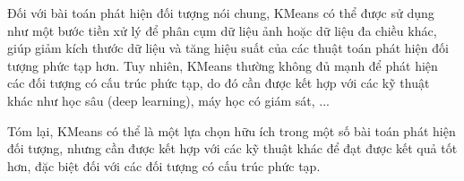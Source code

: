 \documentclass[a4paper]{article}
\begin{document}
Đối với bài toán phát hiện đối tượng nói chung, KMeans có thể được sử dụng như
một bước tiền xử lý để phân cụm dữ liệu ảnh hoặc dữ liệu đa chiều khác, giúp giảm
kích thước dữ liệu và tăng hiệu suất của các thuật toán phát hiện đối tượng phức tạp
hơn. Tuy nhiên, KMeans thường không đủ mạnh để phát hiện các đối tượng có cấu
trúc phức tạp, do đó cần được kết hợp với các kỹ thuật khác như học sâu (deep
learning), máy học có giám sát, ...

Tóm lại, KMeans có thể là một lựa chọn hữu ích trong một số bài toán phát hiện
đối tượng, nhưng cần được kết hợp với các kỹ thuật khác để đạt được kết quả tốt hơn,
đặc biệt đối với các đối tượng có cấu trúc phức tạp.
\newpage
\renewcommand*{\bibfont}{\small}
\printbibliography
\end{document}
